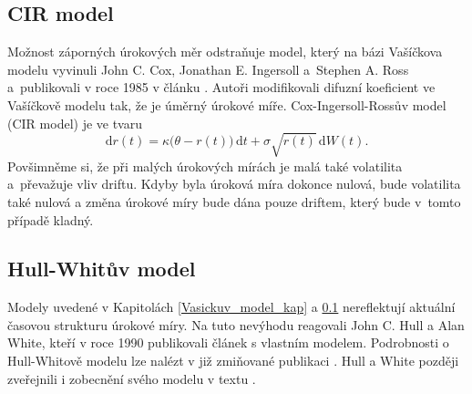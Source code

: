 \documentclass[a4paper,12pt]{report}
\theoremstyle{definition} \newtheorem{definice}[veta]{Definice}
\theoremstyle{remark}
\begin{document}
\subsection{CIR model}\label{CIR_model_kap}
Možnost záporných úrokových měr odstraňuje model, který na bázi Vašíčkova modelu vyvinuli John C. Cox, Jonathan E. Ingersoll a~Stephen A. Ross a~publikovali v roce 1985 v článku \cite{cox1985theory}.
Autoři modifikovali difuzní koeficient ve Vašíčkově modelu tak, že je úměrný úrokové míře.
Cox-Ingersoll-Rossův model (CIR model) je ve tvaru 
\begin{equation}\label{CIR_model}
\mathrm{d}r(t) = \kappa\big(\theta - r(t)\big)\,\mathrm{d}t + \sigma\sqrt{r(t)}\,\mathrm{d}W(t).
\end{equation}
Povšimněme si, že při malých úrokových mírách je malá také volatilita a~převažuje vliv driftu. Kdyby byla úroková míra dokonce nulová, bude volatilita také nulová a změna úrokové míry bude dána pouze driftem, který bude v~tomto případě kladný.


\subsection{Hull-Whitův model}\label{H-W_model_kap}
Modely uvedené v Kapitolách \ref{Vasickuv_model_kap} a \ref{CIR_model_kap} nereflektují aktuální časovou strukturu úrokové míry.
Na tuto nevýhodu reagovali John C. Hull a Alan White, kteří v roce 1990 publikovali článek \cite{hull1990pricing} s vlastním modelem. %
Podrobnosti o Hull-Whitově modelu lze nalézt v již zmiňované publikaci \cite{brigo2007interest}.
Hull a White později zveřejnili i zobecnění svého modelu v textu \cite{hull2001general}.
\end{document}
